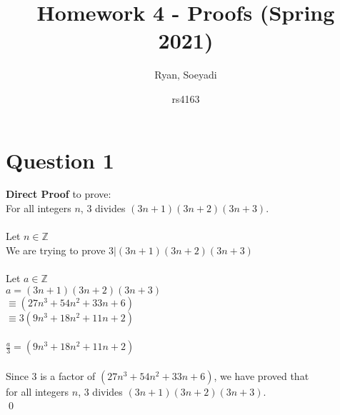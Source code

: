 \documentclass{article}
\title{Homework 4 - Proofs (Spring 2021)}
\author
{
Ryan, Soeyadi
\and rs4163
}
\begin{document}
    \maketitle
    
    \section*{Question 1}
    \textbf{Direct Proof} to prove: \\
    \indent For all integers $n$, $3$ divides $(3n + 1)(3n + 2)(3n + 3)$. \\ \\ 
    Let $n \in \mathbb{Z}$ \\
    We are trying to prove $3 | (3n + 1)(3n + 2)(3n + 3)$ \\ \\
    Let $a \in \mathbb{Z}$ \\
    $a = (3n + 1)(3n + 2)(3n + 3)$ \\
    $\equiv (27n^3 + 54n^2 + 33n + 6)$ \\
    $\equiv 3(9n^3 + 18n^2 + 11n + 2)$ \\ \\
    $\frac{a}{3} = (9n^3 + 18n^2 + 11n + 2)$ \\ \\
    Since $3$ is a factor of $(27n^3 + 54n^2 + 33n + 6)$, we have proved that \\ for all integers $n$, $3$ divides $(3n + 1)(3n + 2)(3n + 3)$. \\ \qed

    \newpage
\end{document}
